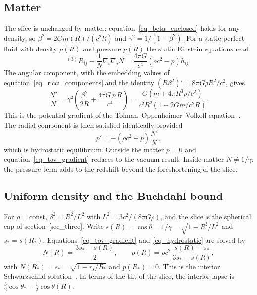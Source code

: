 \documentclass[pdflatex,sn-mathphys-num]{sn-jnl}%
\theoremstyle{thmstyleone}%
\theoremstyle{thmstyletwo}%
\theoremstyle{thmstylethree}%
\begin{document}
\subsection{Matter}\label{sec_lapse_matter}

The slice is unchanged by matter: equation~\eqref{eq_beta_enclosed} holds for any density, so $\beta^2=2Gm(R)/(c^2R)$ and $\gamma^2=1/(1-\beta^2)$. For a static perfect fluid with density $\rho(R)$ and pressure $p(R)$ the static Einstein equations read
\begin{equation}\label{eq_static_fluid}
    {}^{(3)}\!R_{ij}-\frac1N\nabla_i\nabla_jN=\frac{4\pi G}{c^4}\left(\rho c^2-p\right)h_{ij}.
\end{equation}
The angular component, with the embedding values of equation~\eqref{eq_ricci_components} and the identity $\left(R\beta^2\right)'=8\pi G\rho R^2/c^2$, gives
\begin{equation}\label{eq_tov_gradient}
    \frac{N'}{N}=\gamma^2\left(\frac{\beta^2}{2R}+\frac{4\pi G\,p\,R}{c^4}\right)
    =\frac{G\left(m+4\pi R^3p/c^2\right)}{c^2R^2\left(1-2Gm/c^2R\right)} .
\end{equation}
This is the potential gradient of the Tolman--Oppenheimer--Volkoff equation~\cite{Tolman1939,OppenheimerVolkoff1939}. The radial component is then satisfied identically provided
\begin{equation}\label{eq_hydrostatic}
    p'=-\left(\rho c^2+p\right)\frac{N'}{N},
\end{equation}
which is hydrostatic equilibrium. Outside the matter $p=0$ and equation~\eqref{eq_tov_gradient} reduces to the vacuum result. Inside matter $N\neq1/\gamma$: the pressure term adds to the redshift beyond the foreshortening of the slice.

\subsection{Uniform density and the Buchdahl bound}\label{sec_buchdahl}

For $\rho=\text{const}$, $\beta^2=R^2/L^2$ with $L^2=3c^2/(8\pi G\rho)$, and the slice is the spherical cap of section~\ref{sec_three}. Write $s(R)=\cos\theta=1/\gamma=\sqrt{1-R^2/L^2}$ and $s_*=s(R_*)$. Equations~\eqref{eq_tov_gradient} and~\eqref{eq_hydrostatic} are solved by
\begin{equation}\label{eq_uniform_interior}
    N(R)=\frac{3s_*-s(R)}{2},
    \qquad
    p(R)=\rho c^2\,\frac{s(R)-s_*}{3s_*-s(R)} ,
\end{equation}
with $N(R_*)=s_*=\sqrt{1-r_s/R_*}$ and $p(R_*)=0$. This is the interior Schwarzschild solution~\cite{Schwarzschild1916}. In terms of the tilt of the slice, the interior lapse is $\tfrac32\cos\theta_*-\tfrac12\cos\theta(R)$.
\end{document}
